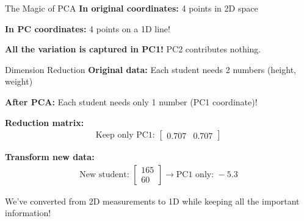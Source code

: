 \documentclass[aspectratio=169]{beamer}
\begin{document}
\begin{frame}{The Magic of PCA}
\textbf{In original coordinates:} 4 points in 2D space

\textbf{In PC coordinates:} 4 points on a 1D line!

\vspace{1em}
\begin{center}
\end{center}

\textbf{All the variation is captured in PC1!} PC2 contributes nothing.
\end{frame}

\begin{frame}{Dimension Reduction}
\textbf{Original data:} Each student needs 2 numbers (height, weight)

\textbf{After PCA:} Each student needs only 1 number (PC1 coordinate)!

\vspace{1em}
\textbf{Reduction matrix:}
\begin{align}
\text{Keep only PC1: } \begin{bmatrix} 0.707 & 0.707 \end{bmatrix}
\end{align}

\textbf{Transform new data:}
\begin{align}
\text{New student: } \begin{bmatrix} 165 \\ 60 \end{bmatrix} \rightarrow \text{PC1 only: } -5.3
\end{align}

We've converted from 2D measurements to 1D while keeping all the important information!
\end{frame}
\end{document}
